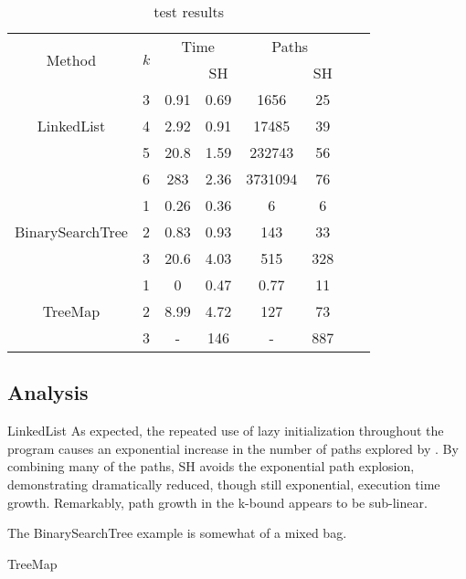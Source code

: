 
\begin{table} [h]
  \centering
  \begin{tabular}{| c | c | c | c | c | c | c | c |}
  \hline
   \multirow{2}{*}{Method }&\multirow{2}{*}{ $k$ }
   &\multicolumn{2}{|c|}{Time} &\multicolumn{2}{|c|}{ Paths }\\
								&	&\gsetxt{}	&SH	&\gsetxt{} & SH\\
   \hline
    \multirow{3}{*}{LinkedList }&3	& 0.91 & 0.69  &1656 & 25		 \\
   		 				& 4	& 2.92 & 0.91	&17485  & 39 \\
   						& 5	& 20.8 & 1.59 &232743 & 56\\
						& 6	& 283 & 2.36		&3731094 & 76\\
    \hline
    \multirow{3}{*}{BinarySearchTree } & 1	&0.26	& 0.36 & 6	 & 6\\
   		 				& 2	& 0.83 & 0.93	& 143 & 33\\
   						& 3	& 20.6 & 4.03 & 515 & 328\\
    \hline
      \multirow{3}{*}{TreeMap}&1	& 0 & 0.47 	& 0.77 & 11 \\
   		 				&2	& 8.99 & 4.72	& 127 & 73 \\
   						& 3	& - & 146	& - & 887 \\
						
    \hline
  \end{tabular}
  \caption{test results}
  \label{tab:results}
\end{table}

\subsection{Analysis}

LinkedList
As expected, the repeated use of lazy initialization throughout the program causes an exponential increase in the number of paths explored by \gsetxt{}. By combining many of the \gsetxt{} paths, SH avoids the exponential path explosion, demonstrating dramatically reduced, though still exponential, execution time growth. Remarkably, path growth in the k-bound appears to be sub-linear.

The BinarySearchTree example is somewhat of a mixed bag. 

TreeMap

